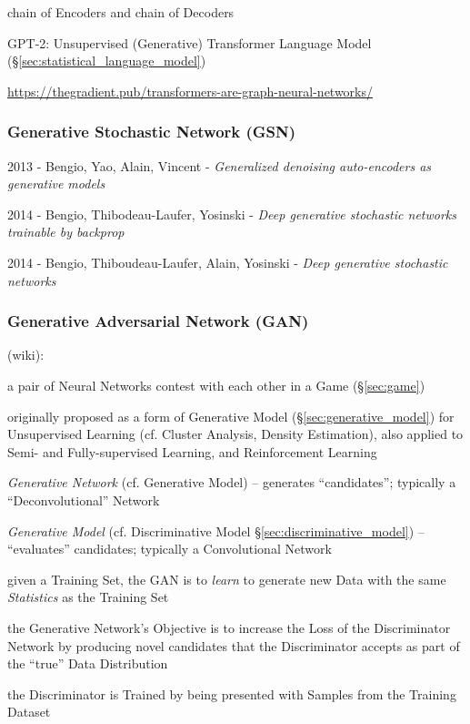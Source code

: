 chain of Encoders and chain of Decoders

GPT-2: Unsupervised (Generative) Transformer Language Model
(\S\ref{sec:statistical_language_model})

\url{https://thegradient.pub/transformers-are-graph-neural-networks/}



\subsubsection{Generative Stochastic Network (GSN)}\label{sec:gsn}

2013 - Bengio, Yao, Alain, Vincent -
\emph{Generalized denoising auto-encoders as generative models}

2014 - Bengio, Thibodeau-Laufer, Yosinski -
\emph{Deep generative stochastic networks trainable by backprop}

2014 - Bengio, Thiboudeau-Laufer, Alain, Yosinski -
\emph{Deep generative stochastic networks}



\subsubsection{Generative Adversarial Network (GAN)}\label{sec:gan}

(wiki):

a pair of Neural Networks contest with each other in a Game (\S\ref{sec:game})

originally proposed as a form of Generative Model
(\S\ref{sec:generative_model}) for Unsupervised Learning (cf. Cluster Analysis,
Density Estimation),
also applied to Semi- and Fully-supervised Learning, and Reinforcement Learning

\emph{Generative Network} (cf. Generative Model) -- generates ``candidates'';
typically a ``Deconvolutional'' Network

\emph{Generative Model} (cf. Discriminative Model
\S\ref{sec:discriminative_model}) -- ``evaluates'' candidates; typically a
Convolutional Network

given a Training Set, the GAN is to \emph{learn} to generate new Data with the
same \emph{Statistics} as the Training Set

the Generative Network's Objective is to increase the Loss of the Discriminator
Network by producing novel candidates that the Discriminator accepts as part of
the ``true'' Data Distribution

the Discriminator is Trained by being presented with Samples from the Training
Dataset

